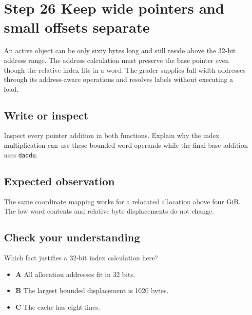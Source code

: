 \section{Step 26 Keep wide pointers and small offsets separate}\label{transpose-s26}

An active object can be only sixty bytes long and still reside above the 32-bit address range. The address calculation must preserve the base pointer even though the relative index fits in a word. The grader supplies full-width addresses through its address-aware operations and resolves labels without executing a load.

\subsection{Write or inspect}
Inspect every pointer addition in both functions. Explain why the index multiplication can use these bounded word operands while the final base addition uses \texttt{daddu}.

\subsection{Expected observation}
The same coordinate mapping works for a relocated allocation above four GiB. The low word contents and relative byte displacements do not change.

\subsection{Check your understanding}
Which fact justifies a 32-bit index calculation here?

\begin{itemize}
  \item \textbf{A} All allocation addresses fit in 32 bits.
  \item \textbf{B} The largest bounded displacement is 1020 bytes.
  \item \textbf{C} The cache has eight lines.
\end{itemize}
